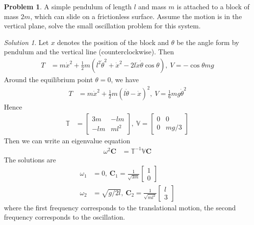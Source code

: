 \documentclass[twoside,11pt]{article}
\newcommand{\lms}{\fontfamily{lmss}\selectfont} %
\theoremstyle{definition}
\newtheorem{problem}{\lms Problem}
\theoremstyle{remark}
\newtheorem*{solution}{Solution}
\begin{document}
\begin{problem}
A simple pendulum of length $l$ and mass $m$ is attached to a block of mass $2m$,
which can slide on a frictionless surface.
Assume the motion is in the vertical plane, solve the small oscillation problem 
for this system.
\end{problem}
\begin{solution}
Let $x$ denotes the position of the block and $\theta$ be the angle
form by pendulum and the vertical line (counterclockwise).
Then
\begin{align*}
    T &= m\dot x^2 + \frac{1}{2}m
    (l^2\dot\theta^2 + \dot x^2 - 2l\dot x\dot\theta\cos\theta),~
    V  = -\cos\theta mg
\end{align*}
Around the equilibrium point $\theta=0$, we have
\begin{align*}
    T &= m\dot x^2 + \frac{1}{2}m(l\dot\theta - \dot x)^2,~
    V  = \frac{1}{6}mg\dot\theta^2
\end{align*}
Hence
\begin{align*}
    \mathbb{T} &= \begin{bmatrix}
        3m & -lm \\ -lm & ml^2
    \end{bmatrix},~
    \mathbb{V}  = \begin{bmatrix}
        0 & 0 \\ 0 & mg/3
    \end{bmatrix}
\end{align*}
Then we can write an eigenvalue equation
\begin{align*}
    \omega^2\mathbf{C} &= \mathbb{T}^{-1}\mathbb{V}\mathbf{C}
\end{align*}
The solutions are
\begin{align*}
    \omega_1 &= 0,~ \mathbf{C}_1 = \frac{1}{\sqrt{3m}}\begin{bmatrix}
        1\\ 0
    \end{bmatrix}\\
    \omega_2 &= \sqrt{g/2l},~ \mathbf{C}_2 = \frac{1}{\sqrt{ml^2}}\begin{bmatrix}
        l\\ 3
    \end{bmatrix}
\end{align*}
where the first frequency corresponds to the translational motion,
the second frequency corresponds to the oscillation.

\end{solution}

\end{document}
